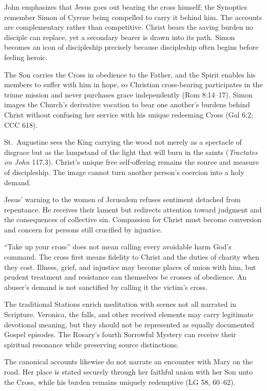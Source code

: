 John emphasizes that Jesus goes out bearing the cross himself; the Synoptics remember Simon of Cyrene being compelled to carry it behind him. The accounts are complementary rather than competitive. Christ bears the saving burden no disciple can replace, yet a secondary bearer is drawn into its path. Simon becomes an icon of discipleship precisely because discipleship often begins before feeling heroic.

The Son carries the Cross in obedience to the Father, and the Spirit enables his members to suffer with him in hope, so Christian cross-bearing participates in the triune mission and never purchases grace independently (Rom 8:14--17). Simon images the Church's derivative vocation to bear one another's burdens behind Christ without confusing her service with his unique redeeming Cross (Gal 6:2; CCC 618).

St.~Augustine sees the King carrying the wood not merely as a spectacle of disgrace but as the lampstand of the light that will burn in the saints (\emph{Tractates on John} 117.3). Christ's unique free self-offering remains the source and measure of discipleship. The image cannot turn another person's coercion into a holy demand.

Jesus' warning to the women of Jerusalem refuses sentiment detached from repentance. He receives their lament but redirects attention toward judgment and the consequences of collective sin. Compassion for Christ must become conversion and concern for persons still crucified by injustice.

``Take up your cross'' does not mean calling every avoidable harm God's command. The cross first means fidelity to Christ and the duties of charity when they cost. Illness, grief, and injustice may become places of union with him, but prudent treatment and resistance can themselves be crosses of obedience. An abuser's demand is not sanctified by calling it the victim's cross.

The traditional Stations enrich meditation with scenes not all narrated in Scripture. Veronica, the falls, and other received elements may carry legitimate devotional meaning, but they should not be represented as equally documented Gospel episodes. The Rosary's fourth Sorrowful Mystery can receive their spiritual resonance while preserving source distinctions.

The canonical accounts likewise do not narrate an encounter with Mary on the road. Her place is stated securely through her faithful union with her Son unto the Cross, while his burden remains uniquely redemptive (LG 58, 60--62).

